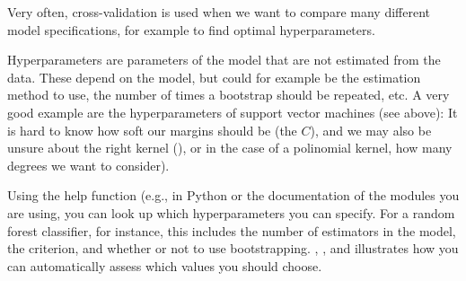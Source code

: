 
Very often, cross-validation is used when we want to compare many
different model specifications, for example to find optimal
hyperparameters.

Hyperparameters are parameters of the model that are not estimated
from the data. These depend on the model, but could for example be the
estimation method to use, the number of times a bootstrap should be
repeated, etc. A very good example are the hyperparameters of support
vector machines (see above): It is hard to know how soft our margins
should be (the $C$), and we may also be unsure about the right kernel
(), or in the case of a polinomial kernel, how many
degrees we want to consider).

Using the help function (e.g.,  in Python
or the documentation of the modules you are using, you can look up
which hyperparameters you can specify. For a random forest classifier,
for instance, this includes the number of estimators in the model, the
criterion, and whether or not to use
bootstrapping. , , and
 illustrates how you can automatically assess which
values you should choose.




